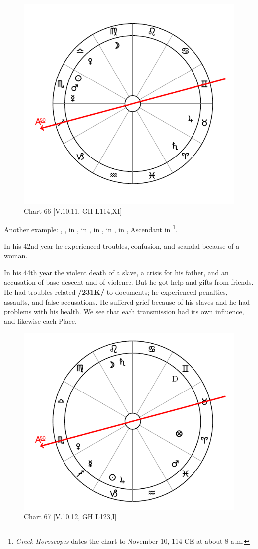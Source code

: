 \begin{figure}
\centering
\vspace{-20pt}
\includegraphics[width=.68\textwidth]{charts/5_10_11}
\caption{Chart 66 [V.10.11, GH L114,XI]}
\label{fig:chart66}
\end{figure}

\noindent Another example: \Sun, \Mars, \Mercury\xspace in \Scorpio, \Saturn\xspace in \Aries, \Moon\xspace in \Virgo, \Jupiter\xspace in \Taurus, \Venus\xspace in \Libra, Ascendant in \Sagittarius\footnote{\textit{Greek Horoscopes} dates the chart to November 10, 114 CE at about 8 a.m.}. 

In his 42nd year he experienced troubles, confusion, and scandal
because of a woman. 

\noindent In his 44th year the violent death of a slave, a crisis for his father, and an accusation of base descent and of violence. But he got help and gifts from friends. He had troubles related \textbf{/231K/} to documents; he experienced penalties, assaults, and false accusations. He suffered grief because of his slaves and he had problems with his health. We see that each transmission had its own influence, and likewise each Place.

\begin{figure}
\centering
\vspace{0pt}
\includegraphics[width=.68\textwidth]{charts/5_10_12}
\caption{Chart 67 [V.10.12, GH L123,I]}
\label{fig:chart67}
\end{figure}

